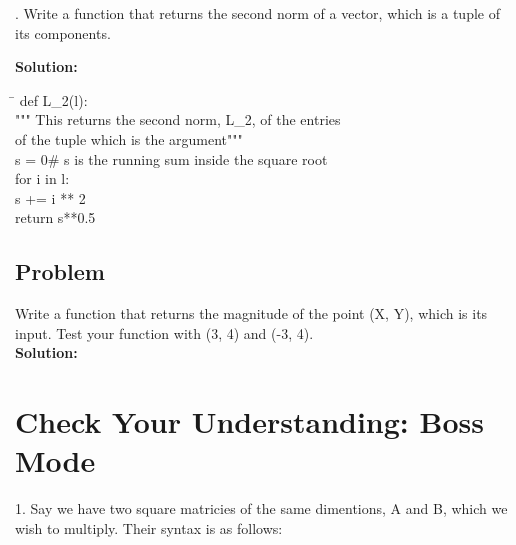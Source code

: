 \documentclass{article}
\newcommand{\icode}[1]{{\ttfamily #1}}
\newenvironment{code}{\begin{tcolorbox}\ttfamily}{\end{tcolorbox}}
\begin{document}
. Write a function that returns the second norm of a vector, which is a tuple of its components.

\noindent \textbf{Solution:}
\begin{code}
	\begin{tabbing}
		\hspace{7 cm} \= \hspace{7 cm} \kill
		def L\_2(l):\\
		\hspace{2 em}""" This returns the second norm, L\_2, of the entries \\
		\hspace{2 em}of the tuple which is the argument"""\\
		\hspace{2 em}s = 0\>\# s is the running sum inside the square root\\
		\hspace{2 em}for i in l:\\
		\hspace{4 em}s += i ** 2\\
		\hspace{2 em}return s**0.5
	\end{tabbing}
\end{code}
\subsection{Problem}
\noindent Write a function that returns the magnitude of the point \icode{(X, Y)}, which is its input. Test your function with \icode{(3, 4)} and \icode{(-3, 4)}.\\
\textbf{Solution:}

\begin{code}
	\vspace{2 in}
\end{code}



\newpage
\section{Check Your Understanding: Boss Mode}
1. Say we have two square matricies of the same dimentions, \icode{A} and \icode{B}, which we wish to multiply. Their syntax is as follows:
\end{document}
